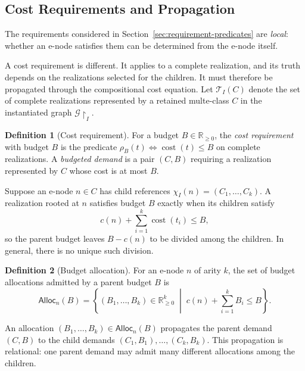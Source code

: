 \documentclass[sigconf,nonacm]{acmart}
\theoremstyle{definition}
\newtheorem{definition}{Definition}[section]
\theoremstyle{plain}
\theoremstyle{remark}
\begin{document}
\subsection{Cost Requirements and Propagation}
\label{sec:cost-requirements}

The requirements considered in
Section~\ref{sec:requirement-predicates} are \emph{local}: whether an
e-node satisfies them can be determined from the e-node itself.

A cost requirement is different.  It applies to a complete realization,
and its truth depends on the realizations selected for the children.
It must therefore be propagated through the compositional cost
equation.  Let \(\mathcal T_I(C)\) denote the set of complete
realizations represented by a retained multe-class \(C\) in the
instantiated graph \(\mathcal G\!\restriction_I\).

\begin{definition}[Cost requirement]
For a budget \(B\in\mathbb R_{\geq 0}\), the \emph{cost requirement}
with budget \(B\) is the predicate
\(\rho_B(t)\Leftrightarrow\operatorname{cost}(t)\leq B\) on complete
realizations.  A \emph{budgeted demand} is a pair \((C,B)\)
requiring a realization represented by \(C\) whose cost is at most
\(B\).
\end{definition}

Suppose an e-node \(n\in C\) has child references
\(\chi_I(n)=(C_1,\ldots,C_k)\).  A realization rooted at \(n\)
satisfies budget \(B\) exactly when its children satisfy
\[
c(n)+\sum_{i=1}^{k}\operatorname{cost}(t_i)\leq B,
\]
so the parent budget leaves \(B-c(n)\) to be divided among the
children.  In general, there is no unique such division.

\begin{definition}[Budget allocation]
For an e-node \(n\) of arity \(k\), the set of budget allocations
admitted by a parent budget \(B\) is
\[
\mathsf{Alloc}_n(B)
=
\left\{
(B_1,\ldots,B_k)\in\mathbb R_{\geq 0}^{k}
\;\middle|\;
c(n)+\sum_{i=1}^{k}B_i\leq B
\right\}.
\]
\end{definition}

An allocation \((B_1,\ldots,B_k)\in\mathsf{Alloc}_n(B)\) propagates
the parent demand \((C,B)\) to the child demands
\((C_1,B_1),\ldots,(C_k,B_k)\).  This propagation is relational: one
parent demand may admit many different allocations among the
children.
\end{document}
